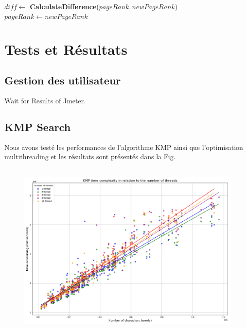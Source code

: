 \documentclass[11pt,english]{article}
\begin{document}
{\begin{algorithm}[H]
{            %
            $diff \gets$ \textbf{CalculateDifference}($pageRank, newPageRank$)\;
            $pageRank \gets newPageRank$\;
        }
        \;
    \end{algorithm}
        
        

    \section{Tests et Résultats}

    \subsection{Gestion des utilisateur}

    \indent

    Wait for Results of Jmeter.

    \subsection{KMP Search}

    \indent 
    
    Nous avons testé les performances de l'algorithme KMP ainsi que l'optimisation multithreading et les résultats sont présentés dans la Fig.

    \begin{figure}[H]
        \begin{center}
            \includegraphics[height=9cm]{./src/KMP_Multi.png}
        \end{center}
    \end{figure}

}
\end{document}
